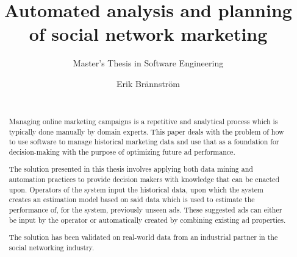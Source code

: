 \documentclass{sig-alternate}
\begin{document}
\title{Automated analysis and planning of social network marketing}
\subtitle{Master's Thesis in Software Engineering}

\author{
\alignauthor
Erik Brännström\\
       \\
}

\maketitle

\begin{abstract}
Managing online marketing campaigns is a repetitive and analytical process which is typically done manually by domain experts. This paper deals with the problem of how to use software to manage historical marketing data and use that as a foundation for decision-making with the purpose of optimizing future ad performance.

The solution presented in this thesis involves applying both data mining and automation practices to provide decision makers with knowledge that can be enacted upon. Operators of the system input the historical data, upon which the system creates an estimation model based on said data which is used to estimate the performance of, for the system, previously unseen ads. These suggested ads can either be input by the operator or automatically created by combining existing ad properties.

The solution has been validated on real-world data from an industrial partner in the social networking industry.

\end{abstract}



\end{document}
